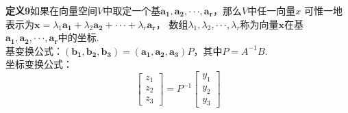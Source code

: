 \documentclass[UTF8]{ctexart}
\begin{document}
\noindent \textbf{定义9}\quad  如果在向量空间$V$中取定一个基$\bm{a_1},\bm{a_2},\cdot\cdot\cdot,\bm{a_r}$，那么$V$中任一向量$x$ 可惟一地表示为$\bm{x}=\lambda_1\bm{a_1}+\lambda_2 \bm{a_2}+\cdot\cdot\cdot+\lambda_r \bm{a_r}$，
数组$\lambda_1,\lambda_2,\cdot\cdot\cdot,\lambda_r$称为向量$\bm{x}$在基$\bm{a_1},\bm{a_2},\cdot\cdot\cdot,\bm{a_r}$中的坐标.
\\ 基变换公式：$(\bm{b_1},\bm{b_2},\bm{b_3})=(\bm{a_1},\bm{a_2},\bm{a_3})P$，其中$P=A^{-1}B$.
\\ 坐标变换公式：
\begin{equation}       %
\left[                %
  \begin{array}{ccc}   %
   z_1\\  %
    z_2\\  
    z_3%
  \end{array}
\right]
=P^{-1}{
\left[                %
  \begin{array}{ccc}   %
   y_1\\  %
    y_2\\
    y_3%
  \end{array}
\right]}
\end{equation}
\end{document}
